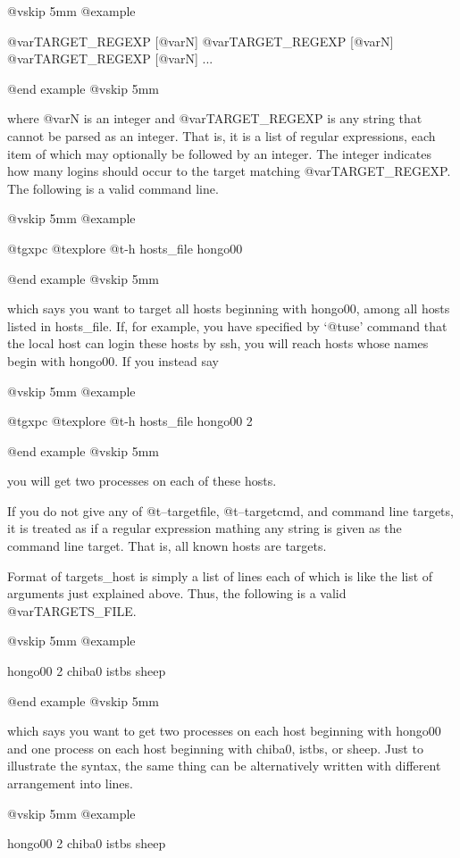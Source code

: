 @vskip 5mm
@example

   @var{TARGET_REGEXP} [@var{N}] @var{TARGET_REGEXP} [@var{N}] @var{TARGET_REGEXP} [@var{N}] ...

@end example
@vskip 5mm

where @var{N} is an integer and @var{TARGET_REGEXP} is any string that cannot
be parsed as an integer. That is, it is a list of regular
expressions, each item of which may optionally be followed by an
integer. The integer indicates how many logins should occur to
the target matching @var{TARGET_REGEXP}. The following is a valid
command line.

@vskip 5mm
@example

  @t{gxpc} @t{explore} @t{-h} hosts_file hongo00

@end example
@vskip 5mm

which says you want to target all hosts beginning with hongo00,
among all hosts listed in hosts_file.  If, for example, you have
specified by `@t{use}' command that the local host can login these
hosts by ssh, you will reach hosts whose names begin with
hongo00.  If you instead say

@vskip 5mm
@example

  @t{gxpc} @t{explore} @t{-h} hosts_file hongo00 2

@end example
@vskip 5mm

you will get two processes on each of these hosts.

If you do not give any of @t{--targetfile}, @t{--targetcmd}, and command
line targets, it is treated as if a regular expression mathing
any string is given as the command line target. That is, all
known hosts are targets.

Format of targets_host is simply a list of lines each of which
is like the list of arguments just explained above. Thus, the
following is a valid @var{TARGETS_FILE}.

@vskip 5mm
@example

  hongo00 2
  chiba0
  istbs
  sheep

@end example
@vskip 5mm

which says you want to get two processes on each host beginning
with hongo00 and one process on each host beginning with chiba0,
istbs, or sheep. Just to illustrate the syntax, the same thing
can be alternatively written with different arrangement into
lines.

@vskip 5mm
@example

  hongo00 2 chiba0
  istbs sheep

